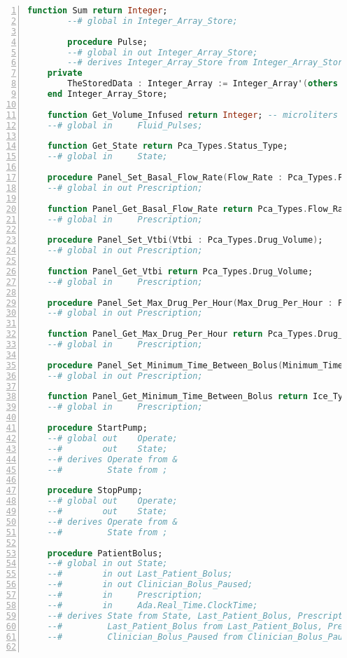 \begin{lstlisting}[language=ada, gobble=0, numbers=left, caption={\lstinline{Pca_Operation} package}, label={listing:pca_ravenscar:pca_operation}]
        function Sum return Integer;
        --# global in Integer_Array_Store;

        procedure Pulse;
        --# global in out Integer_Array_Store;
        --# derives Integer_Array_Store from Integer_Array_Store;
    private
        TheStoredData : Integer_Array := Integer_Array'(others => 0);
    end Integer_Array_Store;

    function Get_Volume_Infused return Integer; -- microliters
    --# global in     Fluid_Pulses;

    function Get_State return Pca_Types.Status_Type;
    --# global in     State;

    procedure Panel_Set_Basal_Flow_Rate(Flow_Rate : Pca_Types.Flow_Rate);
    --# global in out Prescription;

    function Panel_Get_Basal_Flow_Rate return Pca_Types.Flow_Rate;
    --# global in     Prescription;

    procedure Panel_Set_Vtbi(Vtbi : Pca_Types.Drug_Volume);
    --# global in out Prescription;

    function Panel_Get_Vtbi return Pca_Types.Drug_Volume;
    --# global in     Prescription;

    procedure Panel_Set_Max_Drug_Per_Hour(Max_Drug_Per_Hour : Pca_Types.Drug_Volume);
    --# global in out Prescription;

    function Panel_Get_Max_Drug_Per_Hour return Pca_Types.Drug_Volume;
    --# global in     Prescription;

    procedure Panel_Set_Minimum_Time_Between_Bolus(Minimum_Time_Between_Bolus : Ice_Types.Minute);
    --# global in out Prescription;

    function Panel_Get_Minimum_Time_Between_Bolus return Ice_Types.Minute;
    --# global in     Prescription;

    procedure StartPump;
    --# global out    Operate;
    --#        out    State;
    --# derives Operate from &
    --#         State from ;

    procedure StopPump;
    --# global out    Operate;
    --#        out    State;
    --# derives Operate from &
    --#         State from ;

    procedure PatientBolus;
    --# global in out State;
    --#        in out Last_Patient_Bolus;
    --#        in out Clinician_Bolus_Paused;
    --#        in     Prescription;
    --#        in     Ada.Real_Time.ClockTime;
    --# derives State from State, Last_Patient_Bolus, Prescription, Ada.Real_Time.ClockTime &
    --#         Last_Patient_Bolus from Last_Patient_Bolus, Prescription, Ada.Real_Time.ClockTime &
    --#         Clinician_Bolus_Paused from Clinician_Bolus_Paused, State, Last_Patient_Bolus, Prescription, Ada.Real_Time.ClockTime;


\end{lstlisting}
